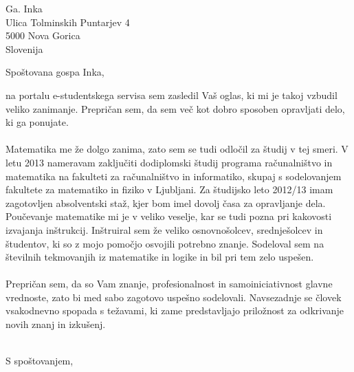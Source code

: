 \documentclass[a4paper]{scrlttr2}
\begin{document}
 
\begin{letter}{Ga. Inka \\ Ulica Tolminskih Puntarjev 4 \\ 5000 Nova Gorica \\ Slovenija}
 

\opening{Spoštovana gospa Inka,}
 
na portalu e-studentskega servisa sem zasledil Vaš oglas, ki mi je takoj vzbudil veliko zanimanje. Prepričan sem, da sem več kot dobro sposoben opravljati delo, ki ga ponujate. 
\\
\\
 Matematika me že dolgo zanima, zato sem se tudi odločil za študij v tej smeri. V letu 2013 nameravam zaključiti dodiplomski študij programa računalništvo in matematika na fakulteti za računalništvo in informatiko, skupaj s sodelovanjem fakultete za matematiko in fiziko v Ljubljani. Za študijsko leto 2012/13 imam zagotovljen absolventski staž, kjer bom imel dovolj časa za opravljanje dela. 
Poučevanje matematike mi je v veliko veselje, kar se tudi pozna pri kakovosti izvajanja inštrukcij. Inštruiral sem že veliko osnovnošolcev, srednješolcev in študentov, ki so z mojo pomočjo osvojili potrebno znanje. Sodeloval sem na številnih tekmovanjih iz matematike in logike in bil pri tem zelo uspešen.
\\
\\
Prepričan sem, da so Vam znanje, profesionalnost in samoiniciativnost glavne vrednoste, zato bi med sabo zagotovo uspešno sodelovali. Navsezadnje se človek vsakodnevno spopada s težavami, ki zame predstavljajo priložnost za odkrivanje novih znanj in izkušenj.
\\
\\
\closing{S spoštovanjem,}

\vspace{5mm}




 
\end{letter}
 
\end{document}
